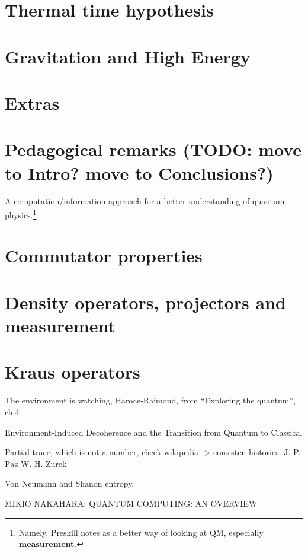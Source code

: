 \documentclass{book}
\begin{document}
\chapter{Thermal time hypothesis}


\chapter{Gravitation and High Energy}



\chapter{Extras}


\chapter{Pedagogical remarks (TODO: move to Intro? move to Conclusions?)}
A computation/information approach for a better understanding of quantum
physics.\footnote{
  Namely, Preskill notes \cite{PreskillNotes} as a better way of looking at QM,
  especially \textbf{measurement}.
}

\appendix
\chapter{Commutator properties}

\chapter{Density operators, projectors and measurement}

\chapter{Kraus operators}
The environment is watching, Haroce-Raimond, from ``Exploring the quantum'', ch.4

Environment-Induced Decoherence and the Transition from Quantum to Classical

Partial trace, which is not a number, check wikipedia -> consisten histories.
J. P. Paz W. H. Zurek

Von Neumann and Shanon entropy.

MIKIO NAKAHARA: QUANTUM COMPUTING: AN OVERVIEW

\printbibliography[title=References]
\end{document}
